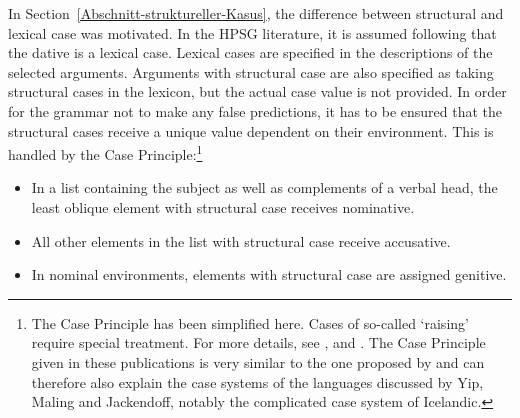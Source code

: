 In Section~\ref{Abschnitt-struktureller-Kasus}, the difference between structural
and lexical case was motivated. In the HPSG literature, it is assumed following \citet{Haider86}
that the dative is a lexical case. Lexical cases are specified in the descriptions of the selected
arguments. Arguments with structural case are also specified as taking structural cases in the lexicon, but the actual
case value is not provided. In order for the grammar not to make any false predictions, it has to be ensured that the structural cases receive a unique value dependent on their
environment. This is handled by the Case Principle:\footnote{%
	The Case Principle has been simplified here. Cases of so-called `raising' require special treatment.
	For more details, see ,  and . The Case Principle given in these publications is very similar to the one proposed by \citet*{YMJ87}
	and can therefore also explain the case systems of the languages discussed by Yip, Maling and Jackendoff, notably the complicated
	case system of Icelandic.
}
\begin{principle-break}
\label{case-p}
\begin{itemize}
\item In a list containing the subject as well as complements of a verbal head, the least oblique element with
structural case receives nominative.
\item All other elements in the list with structural case receive accusative.
\item In nominal environments, elements with structural case are assigned genitive.
\end{itemize}
\end{principle-break}

